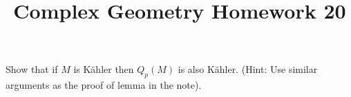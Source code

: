 \documentclass[12pt]{article}
\title{Complex Geometry Homework 20}
\author{}
\date{}
\begin{document}
\maketitle
\begin{problem}
  Show that if \(M\) is Kähler then \(Q_p(M)\) is also Kähler.
  (Hint: Use similar arguments as the proof of lemma in the note).
\end{problem}
\end{document}
